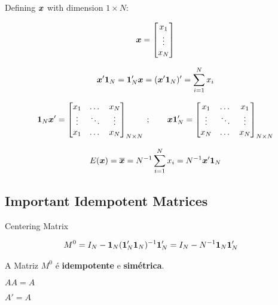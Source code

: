 \documentclass[11pt,oneside,a4paper]{article}
\numberwithin{equation}{section}
\begin{document}
\begin{description}
\begin{description}
Defining $\boldsymbol{x}$ with dimension $1 \times N$:

\begin{align*}
\boldsymbol{x} = 
\begin{bmatrix}
x_{1} \\ \vdots \\ x_{N}	
\end{bmatrix}
\end{align*}

\begin{align*}
\boldsymbol{x}' \boldsymbol{1}_{N} = 
\boldsymbol{1}_{N}' \boldsymbol{x} = 
(\boldsymbol{x}' \boldsymbol{1}_{N})' = 
\sum_{i=1}^{N} x_{i}
\end{align*}

\begin{align*}
\boldsymbol{1}_{N} \boldsymbol{x}' =
\begin{bmatrix}
	x_{1} & \dots & x_{N} \\
	\vdots & \ddots & \vdots \\
	x_{1} & \dots & x_{N}	
\end{bmatrix}_{N \times N}
\; ; \qquad
\boldsymbol{x} \boldsymbol{1}_{N}' =
\begin{bmatrix}
	x_{1} & \dots & x_{1} \\
	\vdots & \ddots & \vdots \\
	x_{N} & \dots & x_{N}	
\end{bmatrix}_{N \times N}
\end{align*}

\begin{align*}
E( \boldsymbol{x} ) = \overline{\boldsymbol{x}} = N^{-1} \sum_{i=1}^{N} x_{i} = N^{-1} \boldsymbol{x}'\boldsymbol{1}_{N}
\end{align*}

\subsection*{Important Idempotent Matrices}
\noindent
\cite[p. 978, A.28]{greene-7ed}

Centering Matrix

\vspace{-1 em}
\begin{align*}
	M^{0} &= 
	I_{N} - \boldsymbol{1}_{N} ( \boldsymbol{1}_{N}' \boldsymbol{1}_{N} )^{-1} \boldsymbol{1}_{N}'
	= 
	I_{N} - N^{-1} \boldsymbol{1}_{N} \boldsymbol{1}_{N}' 
\end{align*}

A Matriz $M^{0}$ é \textbf{idempotente} e \textbf{simétrica}.

\begin{description}\itemsep0pt
\item [Idempotência:] $AA = A$
\item [Simetria:] $A'=A$
\end{description}



\end{description}
\end{description}
\end{document}
